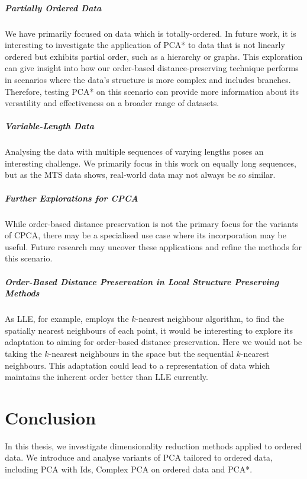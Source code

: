 \documentclass[pdftex,12pt,a4paper]{report}
\begin{document}
\paragraph{Partially Ordered Data}
We have primarily focused on data which is totally-ordered.
In future work, it is interesting to investigate the application of PCA* to data that is not linearly ordered but exhibits partial order, such as a hierarchy or graphs.
This exploration can give insight into how our order-based distance-preserving technique performs in scenarios where the data's structure is more complex and includes branches.
Therefore, testing PCA* on this scenario can provide more information about its versatility and effectiveness on a broader range of datasets.

\paragraph{Variable-Length Data}
Analysing the data with multiple sequences of varying lengths poses an interesting challenge.
We primarily focus in this work on equally long sequences, but as the MTS data shows, real-world data may not always be so similar.

\paragraph{Further Explorations for CPCA}
While order-based distance preservation is not the primary focus for the variants of CPCA, there may be a specialised use case where its incorporation may be useful.
Future research may uncover these applications and refine the methods for this scenario.

\paragraph{Order-Based Distance Preservation in Local Structure Preserving Methods}
As LLE, for example, employs the $k$-nearest neighbour algorithm, to find the spatially nearest neighbours of each point, it would be interesting to explore its adaptation to aiming for order-based distance preservation.
Here we would not be taking the $k$-nearest neighbours in the space but the sequential $k$-nearest neighbours.
This adaptation could lead to a representation of data which maintains the inherent order better than LLE currently.


\chapter{Conclusion} \label{conclusion}
In this thesis, we investigate dimensionality reduction methods applied to ordered data.
We introduce and analyse variants of PCA tailored to ordered data, including PCA with Ids, Complex PCA on ordered data and PCA*.
\end{document}
